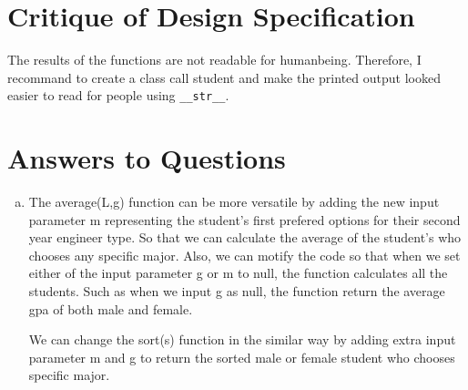 \documentclass[12pt]{article}
\begin{document}
\section{Critique of Design Specification}



The results of the functions are not readable for humanbeing. Therefore, I recommand to create a class call student and make the printed output looked easier to read for people using \verb|__str__|.


\section{Answers to Questions}

\begin{enumerate}[(a)]

\item The average(L,g) function can be more versatile by adding the new input parameter m representing the student's first prefered options for their second year engineer type. So that we can calculate the average of the student's who chooses any specific major. Also, we can motify the code so that when we set either of the input parameter g or m to null, the function calculates all the students. Such as when we input g as null, the function return the average gpa of both male and female.

We can change the sort(s) function in the similar way by adding extra input parameter m and g to return the sorted male or female student who chooses specific major.
                                                                                                                                                                                                                                                                                                                                                                                                                                                                                                                                                                                                                                                                                                                                                                                                                                                                                                                                                                                                                                                                                                                                                                                                                                                                                    

\end{enumerate}
\end{document}

